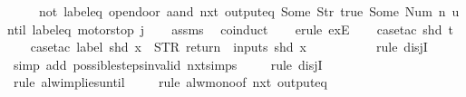 \begin{isabellebody}
\ \ \ \ \ {\isachardoublequoteopen}{\isacharparenleft}{\isacharparenleft}not\ {\isacharparenleft}label{\isacharunderscore}eq\ {\isacharprime}{\isacharprime}opendoor{\isacharprime}{\isacharprime}\ aand\ nxt\ {\isacharparenleft}output{\isacharunderscore}eq\ {\isacharbrackleft}Some\ {\isacharparenleft}Str\ {\isacharprime}{\isacharprime}true{\isacharprime}{\isacharprime}{\isacharparenright}{\isacharcomma}\ Some\ {\isacharparenleft}Num\ n{\isacharparenright}{\isacharbrackright}{\isacharparenright}{\isacharparenright}{\isacharparenright}\ until\ {\isacharparenleft}label{\isacharunderscore}eq\ {\isacharprime}{\isacharprime}motorstop{\isacharprime}{\isacharprime}{\isacharparenright}{\isacharparenright}\ j{\isachardoublequoteclose}\isanewline
%
\isadelimproof
\ \ %
\endisadelimproof
%
\isatagproof
{}\isamarkupfalse%
\ assms\ \isamarkupfalse%
\ coinduct\isanewline
\ \ \isamarkupfalse%
\ {\isacharparenleft}erule\ exE{\isacharparenright}{\isacharplus}\isanewline
\ \ \isamarkupfalse%
\ {\isacharparenleft}case{\isacharunderscore}tac\ {\isachardoublequoteopen}shd\ t{\isachardoublequoteclose}{\isacharparenright}\isanewline
\ \ \isamarkupfalse%
\ {\isacharparenleft}case{\isacharunderscore}tac\ {\isachardoublequoteopen}label\ {\isacharparenleft}shd\ x{\isacharparenright}\ {\isacharequal}\ STR\ {\isacharprime}{\isacharprime}return{\isacharprime}{\isacharprime}\ {\isasymand}\ inputs\ {\isacharparenleft}shd\ x{\isacharparenright}\ {\isacharequal}\ {\isacharbrackleft}{\isacharbrackright}{\isachardoublequoteclose}{\isacharparenright}\isanewline
\ \ \ \isamarkupfalse%
\isanewline
\ \ \ \isamarkupfalse%
\ {\isacharparenleft}rule\ disjI{}{\isacharparenright}\isanewline
\ \ \ \isamarkupfalse%
\ {\isacharparenleft}simp\ add{\isacharcolon}\ possible{\isacharunderscore}steps{\isacharunderscore}{}{\isacharunderscore}invalid\ nxt{\isachardot}simps{\isacharparenright}\isanewline
\ \ \ \isamarkupfalse%
\ {\isacharparenleft}rule\ disjI{}{\isacharparenright}\isanewline
\ \ \ \isamarkupfalse%
\ {\isacharparenleft}rule\ alw{\isacharunderscore}implies{\isacharunderscore}until{\isacharparenright}\isanewline
\ \ \ \isamarkupfalse%
\ {\isacharparenleft}rule\ alw{\isacharunderscore}mono{\isacharbrackleft}of\ {\isachardoublequoteopen}nxt\ {\isacharparenleft}output{\isacharunderscore}eq\ {\isacharbrackleft}{\isacharbrackright}{\isacharparenright}{\isachardoublequoteclose}{\isacharbrackright}{\isacharparenright}\isanewline

\end{isabellebody}
